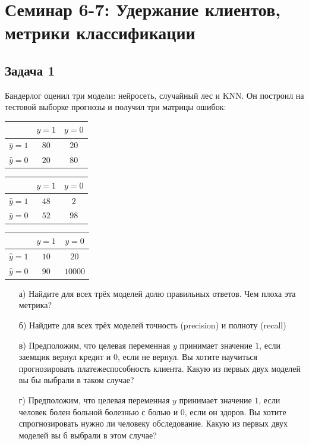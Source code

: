 \documentclass[12pt, a4paper, oneside]{article}
\begin{document}
\section*{Семинар 6-7: Удержание клиентов, метрики классификации}


\subsection*{Задача 1}

Бандерлог оценил три модели: нейросеть, случайный лес и KNN.  Он построил на тестовой выборке прогнозы и получил три матрицы ошибок: 

\begin{minipage}[t]{0.33\textwidth}
\begin{tabular}{|c|c|c|}
\hline
		              & $y=1$  &  $ y = 0$ \\  \hline 
$\hat y = 1$  &   $80$ &    $20$ \\      \hline 
$\hat y = 0$ &   $20$ &     $80$ \\      \hline 
\end{tabular}
\end{minipage}
\begin{minipage}[t]{0.33\textwidth}
\begin{tabular}{|c|c|c|}
	\hline
	& $y=1$  &  $ y = 0$ \\  \hline 
	$\hat y = 1$  &   $48$ &    $2$ \\      \hline 
	$\hat y = 0$ &   $52$ &     $98$ \\      \hline 
\end{tabular}
\end{minipage}
\begin{minipage}[t]{0.33\textwidth}
\begin{tabular}{|c|c|c|}
	\hline
	& $y=1$  &  $ y = 0$ \\  \hline 
	$\hat y = 1$  &   $10$ &    $20$ \\         \hline 
	$\hat y = 0$ &   $90$ &    $10000$ \\   \hline 
\end{tabular}
\end{minipage}





\begin{enumerate}
	\item[а)]   Найдите для всех трёх моделей долю правильных ответов. Чем плоха эта метрика? 
	\item[б)]   Найдите для всех трёх моделей точность (precision) и полноту (recall)
	\item[в)]   Предположим, что целевая переменная $y$ принимает значение $1$, если заемщик вернул кредит  и $0$, если не вернул. Вы хотите научиться прогнозировать платежеспособность клиента. Какую из первых двух моделей вы бы выбрали в таком случае? 
	\item[г)]  Предположим, что целевая переменная $y$ принимает значение $1$, если человек болен больной болезнью с болью и $0$, если он здоров. Вы хотите спрогнозировать нужно ли человеку обследование. Какую из первых двух моделей вы б выбрали в этом случае? 
\end{enumerate}
\end{document}

